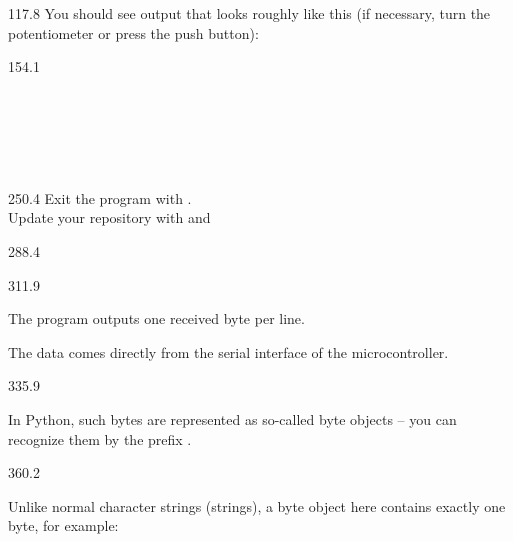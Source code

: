 \documentclass{aslab}
\begin{document}
\begin{region}{117.8}
You should see output that looks roughly like this (if necessary, turn the
potentiometer or press the push button):
\end{region}

\begin{region}{154.1}
\\
\\
\\
\\
\\
\\
\end{region}

\begin{region}[pitch=13]{250.4}
Exit the program with .\\
Update your repository with  and
\end{region}

\begin{region}{288.4}
\end{region}

\begin{region}{311.9}
\begin{dashlist}
\item The program outputs one received byte per line.
\item The data comes directly from the serial interface of the
  microcontroller.
\end{dashlist}
\end{region}

\begin{region}[pitch=12.8]{335.9}
\begin{dashlist}
\item In Python, such bytes are represented as so-called byte objects --
  you can recognize them by the prefix .
\end{dashlist}
\end{region}

\begin{region}[pitch=12.5]{360.2}
\begin{dashlist}
\item Unlike normal character strings (strings), a byte object here contains
  exactly one byte, for example:
\end{dashlist}
\end{region}
\end{document}
